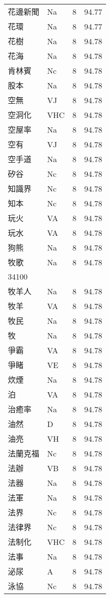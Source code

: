 \documentclass[twocolumn]{book}
\begin{document}
\begin{supertabular}{llrr}
花邊新聞 & Na & 8 &  94.77\\
花環 & Na & 8 &  94.77\\
花樹 & Na & 8 &  94.78\\
花海 & Na & 8 &  94.78\\
肯林賓 & Nc & 8 &  94.78\\
股本 & Na & 8 &  94.78\\
空無 & VJ & 8 &  94.78\\
空洞化 & VHC & 8 &  94.78\\
空屋率 & Na & 8 &  94.78\\
空有 & VJ & 8 &  94.78\\
空手道 & Na & 8 &  94.78\\
矽谷 & Nc & 8 &  94.78\\
知識界 & Nc & 8 &  94.78\\
知本 & Nc & 8 &  94.78\\
玩火 & VA & 8 &  94.78\\
玩水 & VA & 8 &  94.78\\
狗熊 & Na & 8 &  94.78\\
牧歌 & Na & 8 &  94.78\\
34100\\
牧羊人 & Na & 8 &  94.78\\
牧羊 & VA & 8 &  94.78\\
牧民 & Na & 8 &  94.78\\
牧 & Na & 8 &  94.78\\
爭霸 & VA & 8 &  94.78\\
爭睹 & VE & 8 &  94.78\\
炊煙 & Na & 8 &  94.78\\
泊 & VA & 8 &  94.78\\
治癒率 & Na & 8 &  94.78\\
油然 & D & 8 &  94.78\\
油亮 & VH & 8 &  94.78\\
法蘭克福 & Nc & 8 &  94.78\\
法辦 & VB & 8 &  94.78\\
法器 & Na & 8 &  94.78\\
法軍 & Na & 8 &  94.78\\
法界 & Nc & 8 &  94.78\\
法律界 & Nc & 8 &  94.78\\
法制化 & VHC & 8 &  94.78\\
法事 & Na & 8 &  94.78\\
泌尿 & A & 8 &  94.78\\
泳協 & Nc & 8 &  94.78\\

\end{supertabular}
\end{document}
